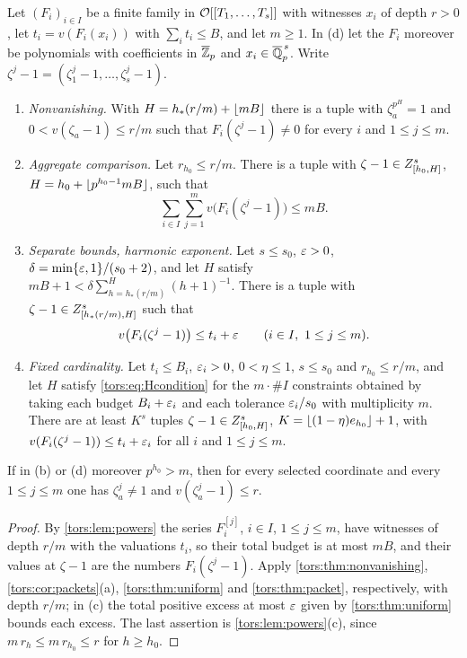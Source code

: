 \begin{proposition}\label{tors:prop:powers}
Let $(F_i)_{i\in I}$ be a finite family in $\mathcal{O}[[T_1,\dots,T_s]]$ with witnesses $x_i$ of
depth $r>0$, let $t_i=v(F_i(x_i))$ with $\sum_it_i\le B$, and let $m\ge1$. In
\textup{(d)} let the $F_i$ moreover be polynomials with coefficients in $\overline{\mathbb{Z}}_p$
and $x_i\in\overline{\mathbb{Q}}_p^{\,s}$. Write $\zeta^j-1=(\zeta_1^j-1,\dots,\zeta_s^j-1)$.
\begin{enumerate}[label=\textup{(\alph*)}]
\item \emph{Nonvanishing.} With $H=h_*(r/m)+\lfloor mB\rfloor$ there is a tuple with
  $\zeta_a^{p^H}=1$ and $0<v(\zeta_a-1)\le r/m$ such that $F_i(\zeta^j-1)\ne0$ for every
  $i$ and $1\le j\le m$.
\item \emph{Aggregate comparison.} Let $r_{h_0}\le r/m$. There is a tuple with
  $\zeta-1\in Z_{[h_0,H]}^s$, $H=h_0+\lfloor p^{h_0-1}mB\rfloor$, such that
  \[
    \sum_{i\in I}\sum_{j=1}^mv\bigl(F_i(\zeta^j-1)\bigr)\le mB .
  \]
\item \emph{Separate bounds, harmonic exponent.} Let $s\le s_0$, $\varepsilon>0$,
  $\delta=\min\{\varepsilon,1\}/(s_0+2)$, and let $H$ satisfy
  $mB+1<\delta\sum_{h=h_*(r/m)}^{H}(h+1)^{-1}$. There is a tuple with
  $\zeta-1\in Z_{[h_*(r/m),H]}^s$ such that
  \[
    v\bigl(F_i(\zeta^j-1)\bigr)\le t_i+\varepsilon\qquad(i\in I,\ 1\le j\le m).
  \]
\item \emph{Fixed cardinality.} Let $t_i\le B_i$, $\varepsilon_i>0$, $0<\eta\le1$,
  $s\le s_0$ and $r_{h_0}\le r/m$, and let $H$ satisfy \eqref{tors:eq:Hcondition} for the
  $m\cdot\#I$ constraints obtained by taking each budget $B_i+\varepsilon_i$ and each tolerance
  $\varepsilon_i/s_0$ with multiplicity $m$. There are at least $K^s$ tuples
  $\zeta-1\in Z_{[h_0,H]}^s$, $K=\lfloor(1-\eta)e_{h_0}\rfloor+1$, with
  $v(F_i(\zeta^j-1))\le t_i+\varepsilon_i$ for all $i$ and $1\le j\le m$.
\end{enumerate}
If in \textup{(b)} or \textup{(d)} moreover $p^{h_0}>m$, then for every selected
coordinate and every $1\le j\le m$ one has $\zeta_a^j\ne1$ and $v(\zeta_a^j-1)\le r$.
\end{proposition}

\begin{proof}
By \cref{tors:lem:powers} the series $F_i^{[j]}$, $i\in I$, $1\le j\le m$, have
witnesses of depth $r/m$ with the valuations $t_i$, so their total budget is at most
$mB$, and their values at $\zeta-1$ are the numbers $F_i(\zeta^j-1)$. Apply
\cref{tors:thm:nonvanishing}, \cref{tors:cor:packets}(a), \cref{tors:thm:uniform} and
\cref{tors:thm:packet}, respectively, with depth $r/m$; in \textup{(c)} the total
positive excess at most $\varepsilon$ given by \cref{tors:thm:uniform} bounds each excess. The
last assertion is \cref{tors:lem:powers}(c), since $m\,r_{h}\le m\,r_{h_0}\le r$ for
$h\ge h_0$.
\end{proof}

